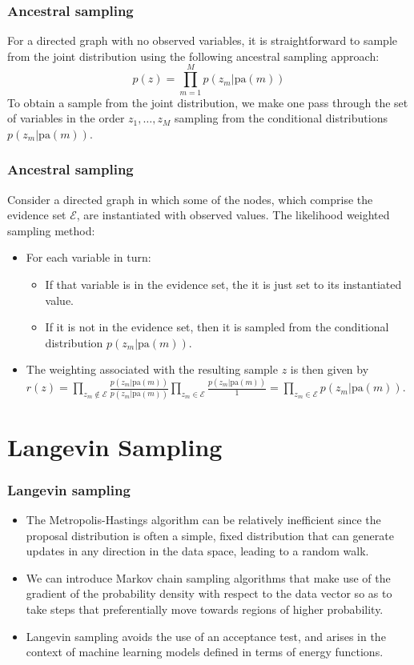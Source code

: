 \documentclass{beamer}
\begin{document}
\begin{frame}
    \frametitle{Ancestral sampling}
    For a directed graph with no observed variables, it is straightforward to sample from the joint distribution using the following ancestral sampling approach:
    \begin{equation*}
        p(z)=\prod_{m=1}^{M}p(z_{m}|\mathrm{pa}(m))
    \end{equation*}
    To obtain a sample from the joint distribution, we make one pass through the set of variables in the order $z_{1},\hdots,z_{M}$ sampling from the conditional distributions $p(z_{m}|\mathrm{pa}(m))$.
\end{frame}

\begin{frame}
    \frametitle{Ancestral sampling}
    Consider a directed graph in which some of the nodes, which comprise the evidence set $\mathcal{E}$, are instantiated with observed values. The likelihood weighted sampling method:
    \begin{itemize}
        \item For each variable in turn:
        \begin{itemize}
            \item If that variable is in the evidence set, the it is just set to its instantiated value.
            \item If it is not in the evidence set, then it is sampled from the conditional distribution $p(z_{m}|\mathrm{pa}(m))$.
        \end{itemize}
        \item The weighting associated with the resulting sample $z$ is then given by $r(z)=\prod_{z_{m}\notin\mathcal{E}}\frac{p(z_{m}|\mathrm{pa}(m))}{p(z_{m}|\mathrm{pa}(m))}\prod_{z_m\in\mathcal{E}}\frac{p(z_{m}|\mathrm{pa}(m))}{1}=\prod_{z_{m}\in\mathcal{E}}p(z_{m}|\mathrm{pa}(m))$.
    \end{itemize}
\end{frame}

\section{Langevin Sampling}

\begin{frame}
    \frametitle{Langevin sampling}
    \begin{itemize}
        \item The Metropolis-Hastings algorithm can be relatively inefficient since the proposal distribution is often a simple, fixed distribution that can generate updates in any direction in the data space, leading to a random walk.
        \item We can introduce Markov chain sampling algorithms that make use of the gradient of the probability density with respect to the data vector so as to take steps that preferentially move towards regions of higher probability.
        \item Langevin sampling avoids the use of an acceptance test, and arises in the context of machine learning models defined in terms of energy functions.
    \end{itemize}
\end{frame}
\end{document}
